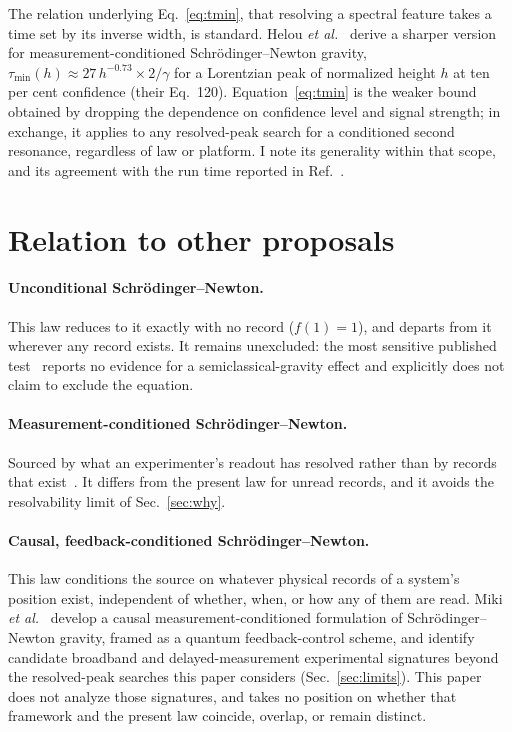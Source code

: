 \documentclass[aps,pra,reprint,amsmath,amssymb,superscriptaddress]{revtex4-2}
\begin{document}
The relation underlying Eq.~\eqref{eq:tmin}, that resolving a spectral feature
takes a time set by its inverse width, is standard. Helou
\emph{et al.}~\cite{Helou2017} derive a sharper version for
measurement-conditioned Schr\"odinger--Newton gravity,
$\tau_{\min}(h)\approx27\,h^{-0.73}\times2/\gamma$ for a Lorentzian peak of
normalized height $h$ at ten per cent confidence (their Eq.~120).
Equation~\eqref{eq:tmin} is the weaker bound obtained by dropping the
dependence on confidence level and signal strength; in exchange, it applies to
any resolved-peak search for a conditioned second resonance, regardless of law
or platform. I note its generality within that scope, and its agreement with
the run time reported in Ref.~\cite{Y25}.

\section{Relation to other proposals}
\label{sec:related}

\paragraph{Unconditional Schr\"odinger--Newton.} This law reduces to it
exactly with no record ($f(1)=1$), and departs from it wherever any record
exists. It remains unexcluded: the most sensitive published
test~\cite{Y25} reports no evidence for a semiclassical-gravity effect and
explicitly does not claim to exclude the equation.

\paragraph{Measurement-conditioned Schr\"odinger--Newton.} Sourced by what an
experimenter's readout has resolved rather than by records that
exist~\cite{Yang2013,Helou2017,LiuEtAl2023}. It differs from the present law
for unread records, and it avoids the resolvability limit of
Sec.~\ref{sec:why}.

\paragraph{Causal, feedback-conditioned Schr\"odinger--Newton.} This law
conditions the source on whatever physical records of a system's position
exist, independent of whether, when, or how any of them are read. Miki
\emph{et al.}~\cite{MikiEtAl2025} develop a causal measurement-conditioned
formulation of Schr\"odinger--Newton gravity, framed as a quantum
feedback-control scheme, and identify candidate broadband and
delayed-measurement experimental signatures beyond the resolved-peak searches
this paper considers (Sec.~\ref{sec:limits}). This paper does not analyze
those signatures, and takes no position on whether that framework and the
present law coincide, overlap, or remain distinct.
\end{document}
